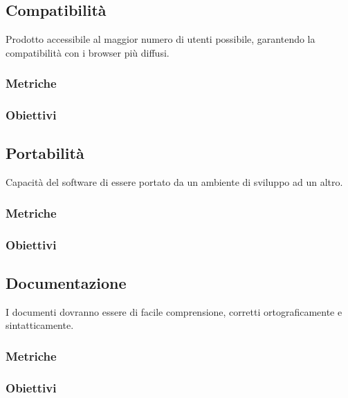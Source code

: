 \subsection{Compatibilità}
Prodotto accessibile al maggior numero di utenti possibile, garantendo la compatibilità con i browser più diffusi.
\subsubsection{Metriche}
\subsubsection{Obiettivi}

\subsection{Portabilità}
Capacità del software di essere portato da un ambiente di sviluppo ad un altro.
\subsubsection{Metriche}
\subsubsection{Obiettivi}

\subsection{Documentazione}
I documenti dovranno essere di facile comprensione, corretti ortograficamente e sintatticamente.
\subsubsection{Metriche}
\subsubsection{Obiettivi}


